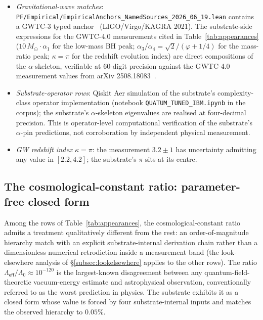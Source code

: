 \documentclass[11pt,a4paper]{amsart}
\theoremstyle{plain}
\theoremstyle{definition}
\begin{document}
\begin{itemize}[itemsep=2pt]
\item \emph{Gravitational-wave matches}: \texttt{PF/Empirical/EmpiricalAnchors\_NamedSources\_2026\_06\_19.lean} contains a GWTC-3 typed anchor~\cite{gwtc3} (LIGO/Virgo/KAGRA 2021). The substrate-side expressions for the GWTC-4.0 measurements cited in Table~\ref{tab:appearances} ($10\,M_\odot\cdot\alpha_1$ for the low-mass BH peak; $\alpha_3/\alpha_4 = \sqrt{2}/(\varphi+1/4)$ for the mass-ratio peak; $\kappa = \pi$ for the redshift evolution index) are direct compositions of the $\alpha$-skeleton, verifiable at 60-digit precision against the GWTC-4.0 measurement values from arXiv 2508.18083~\cite{gwtc4}.
\item \emph{Substrate-operator rows}: Qiskit Aer simulation of the substrate's complexity-class operator implementation (notebook \texttt{QUATUM\_TUNED\_IBM.ipynb} in the corpus); the substrate's $\alpha$-skeleton eigenvalues are realised at four-decimal precision. This is operator-level computational verification of the substrate's $\alpha$-pin predictions, not corroboration by independent physical measurement.
\item \emph{GW redshift index $\kappa = \pi$}: the measurement $3.2 \pm 1$ has uncertainty admitting any value in $[2.2, 4.2]$; the substrate's $\pi$ sits at its centre.
\end{itemize}

\subsection{The cosmological-constant ratio: parameter-free closed form}\label{subsec:lambdaeff}

Among the rows of Table~\ref{tab:appearances}, the cosmological-constant ratio admits a treatment qualitatively different from the rest: an order-of-magnitude hierarchy match with an explicit substrate-internal derivation chain rather than a dimensionless numerical retrodiction inside a measurement band (the look-elsewhere analysis of \S\ref{subsec:lookelsewhere} applies to the other rows). The ratio $\Lambda_{\textsf{eff}}/\Lambda_0 \approx 10^{-120}$ is the largest-known disagreement between any quantum-field-theoretic vacuum-energy estimate and astrophysical observation, conventionally referred to as the worst prediction in physics. The substrate exhibits it as a closed form whose value is forced by four substrate-internal inputs and matches the observed hierarchy to $0.05\%$.
\end{document}
